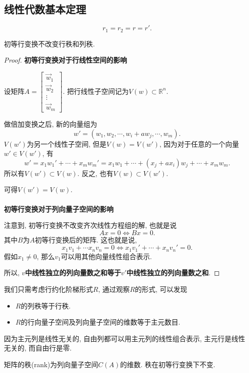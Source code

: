 \subsection{线性代数基本定理}
\begin{theorem}
    \begin{equation}
      r_1=r_2=r=r'.
    \end{equation}
\end{theorem}
\begin{proposition}
    初等行变换不改变行秩和列秩.
\end{proposition}
\begin{proof}
 
    \textbf{初等行变换对于行线性空间的影响}

    设矩阵$A = \begin{bmatrix} 
    \vec{w}_1 \\ 
    \vec{w}_2 \\ 
    \vdots \\ 
    \vec{w}_m 
    \end{bmatrix}$.
    把行线性子空间记为$V(w) \subset \mathbb{R}^{n}$.

    做倍加变换之后, 新的向量组为
    \begin{equation}
      w' = (w_1,w_2,\cdots,w_i+a w_j ,\cdots,w_m).
    \end{equation}
    $V(w')$为另一个线性子空间, 但是$V(w)=V(w')$, 因为对于任意的一个向量$w' \in V(w')$, 有
    \begin{equation}
      w'=x_1w_1'+ \cdots +x_m w_m' = x_1 w_1 + \cdots +(x_j+ ax_i)w_j+ \cdots +x_m w_m.
    \end{equation}
    所以有$V(w') \subset V(w)$. 反之, 也有$V(w) \subset V(w')$.

    可得$V(w')=V(w)$.
    \\ \\
    \textbf{初等行变换对于列向量子空间的影响}

    注意到, 初等行变换不改变齐次线性方程组的解, 也就是说
    \begin{equation}
      Ax=0 \iff Bx=0.
    \end{equation}
    其中$B$为$A$初等行变换后的矩阵. 这也就是说, 
    \begin{equation}
      x_1v_1+ \cdots x_n v_n=0 \iff x_1 v_1' + \cdots +x_n v_n ' = 0.
    \end{equation}
    假如$x_1\neq 0$, 那么$v_1$可以用其他向量线性组合表示.

    所以, \textbf{$v$中线性独立的列向量数之和等于$v'$中线性独立的列向量数之和}.

\end{proof}

我们只需考虑行约化阶梯形式$R$, 通过观察$R$的形式, 可以发现
\begin{itemize}
    \item $R$的列秩等于行秩.
    
    \item $R$的行向量子空间及列向量子空间的维数等于主元数目.
\end{itemize}
因为主元列是线性无关的, 自由列都可以用主元列的线性组合表示, 主元行是线性无关的, 而自由行是零. 

\begin{definition}
  矩阵的秩(rank)为列向量子空间$C(A)$的维数. 秩在初等行变换下不变.
\end{definition}